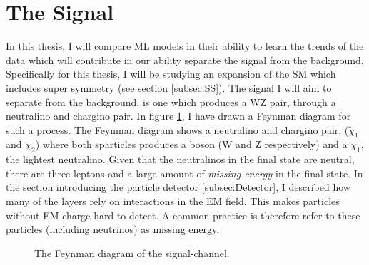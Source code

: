 \section{The Signal}\label{sec:signal}
In this thesis, I will compare \ac{ML} models in their ability to learn the trends of the data which will contribute  
in our ability separate the signal from the background. Specifically for this thesis, I will be studying an expansion of the 
\ac{SM} which includes super symmetry (see section \ref{subsec:SS}). The signal I will aim to separate from the background, is one 
which produces a WZ pair, through a neutralino and chargino pair. In figure \ref{fig:signal}, I have drawn a Feynman diagram for 
such a process. The Feynman diagram shows a neutralino and chargino pair, ($\tilde{\chi}_1$ and $\tilde{\chi}_2$)
where both sparticles produces a boson (W and Z respectively) and a $\tilde{\chi}_1$, the lightest neutralino. Given that the 
neutralinos in the final state are neutral, there are three leptons and a large amount of \emph{missing energy} in the final state.
In the section introducing the particle detector \ref{subsec:Detector}, I described how many of the layers rely on interactions in 
the \ac{EM} field. This makes particles without \ac{EM} charge hard to detect. A common practice is therefore refer to these particles 
(including neutrinos) as missing energy.
\begin{figure}
    \centering
    \caption{The Feynman diagram of the signal-channel.}
    \label{fig:signal}
\end{figure}